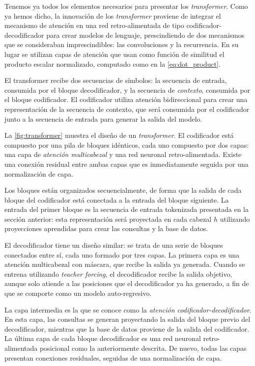 Tenemos ya todos los elementos necesarios para presentar los \textit{transformer}. Como ya hemos dicho, la innovación de los \textit{transformer} proviene de integrar el mecanismo de atención en una red retro-alimentada de tipo codificador-decodificador para crear modelos de lenguaje, prescindiendo de dos mecanismos que se consideraban imprescindibles: las convoluciones y la recurrencia. En su lugar se utilizan capas de atención que usan como función de similitud el producto escalar normalizado, computado como en la \cref{eq:dot_product}.

El transformer recibe dos secuencias de símbolos: la secuencia de entrada, consumida por el bloque decodificador, y la secuencia de \textit{contexto}, consumida por el bloque codificador. El codificador utiliza atención bidireccional para crear una representación de la secuencia de contexto, que será consumida por el codificador junto a la secuencia de entrada para generar la salida del modelo.

La \cref{fig:transformer} muestra el diseño  de un \textit{transformer}. El codificador está compuesto por una pila de bloques idénticos, cada uno compuesto por dos capas: una capa de \textit{atención multicabezal} y una red neuronal retro-alimentada. Existe una conexión residual entre ambas capas que es inmediatamente seguida por una normalización de capa.

Los bloques están organizados secuencialmente, de forma que la salida de cada bloque del codificador está conectada a la entrada del bloque siguiente. La entrada del primer bloque es la secuencia de entrada tokenizada presentada en la sección anterior: esta representación será proyectada en cada cabezal \( h \) utilizando proyecciones aprendidas para crear las consultas y la base de datos. 

El decodificador tiene un diseño similar: se trata de una serie de bloques conectados entre sí, cada uno formado por tres capas. La primera capa es una atención multicabezal con máscara, que recibe la salida ya generada. Cuando se entrena utilizando \textit{teacher forcing}, el decodificador recibe la salida objetivo, aunque solo atiende a las posiciones que el decodificador ya ha generado, a fin de que se comporte como un modelo auto-regresivo.

La capa intermedia es la que se conoce como la \textit{atención codificador-decodificador}. En esta capa, las consultas se generan proyectando la salida del bloque previo del decodificador, mientras que la base de datos proviene de la salida del codificador. La última capa de cada bloque decodificador es una red neuronal retro-alimentada posicional como la anteriormente descrita. De nuevo, todas las capas presentan conexiones residuales, seguidas de una normalización de capa.

